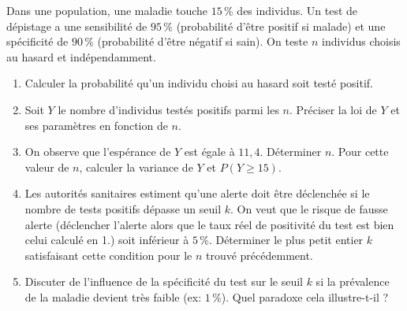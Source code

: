 \documentclass[11pt]{article}
\begin{document}
\begin{exercice}
Dans une population, une maladie touche $15\,\%$ des individus. Un test de dépistage a une sensibilité de $95\,\%$ (probabilité d'être positif si malade) et une spécificité de $90\,\%$ (probabilité d'être négatif si sain). On teste $n$ individus choisis au hasard et indépendamment.
\begin{enumerate}
    \item Calculer la probabilité qu'un individu choisi au hasard soit testé positif.
    \item Soit $Y$ le nombre d'individus testés positifs parmi les $n$. Préciser la loi de $Y$ et ses paramètres en fonction de $n$.
    \item On observe que l'espérance de $Y$ est égale à $11,4$. Déterminer $n$. Pour cette valeur de $n$, calculer la variance de $Y$ et $P(Y \ge 15)$.
    \item Les autorités sanitaires estiment qu'une alerte doit être déclenchée si le nombre de tests positifs dépasse un seuil $k$. On veut que le risque de fausse alerte (déclencher l'alerte alors que le taux réel de positivité du test est bien celui calculé en 1.) soit inférieur à $5\,\%$. Déterminer le plus petit entier $k$ satisfaisant cette condition pour le $n$ trouvé précédemment.
    \item Discuter de l'influence de la spécificité du test sur le seuil $k$ si la prévalence de la maladie devient très faible (ex: $1\,\%$). Quel paradoxe cela illustre-t-il ?
\end{enumerate}
\end{exercice}
\end{document}

